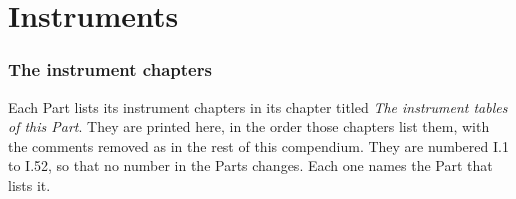 \clearpage
\label{atlaspart:instruments}
\part*{Instruments}
\setcounter{section}{0}
\renewcommand{\thesection}{I.\arabic{section}}
\section*{The instrument chapters}
Each Part lists its instrument chapters in its chapter titled \emph{The instrument tables of this Part}. They are printed here, in the order those chapters list them, with the comments removed as in the rest of this compendium. They are numbered I.1 to I.52, so that no number in the Parts changes. Each one names the Part that lists it.
